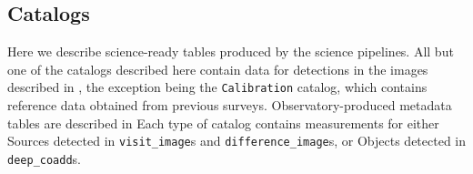 \subsection{Catalogs}
\label{ssec:catalogs}
Here we describe science-ready tables produced by the science pipelines.
All but one of the catalogs described here contain data for detections in the images described in , the exception being the \texttt{Calibration} catalog, which contains reference data obtained from previous surveys.
Observatory-produced \gls{metadata} tables are described in 
Each type of catalog contains measurements for either Sources  detected in  \texttt{visit\_image}s and \texttt{difference\_image}s, or Objects detected in \texttt{deep\_coadd}s.



